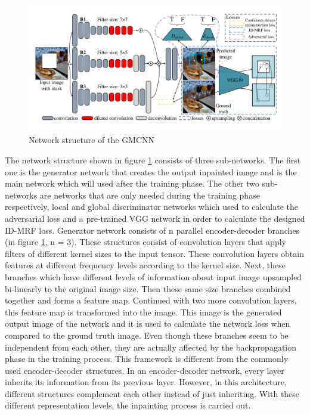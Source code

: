 \begin{figure}[h!]
    \centering
    \includegraphics[width=14cm]{figures/chapter4/gmcnn.png}
    \caption{Network structure of the GMCNN \cite{inpainting_via_multi_cnn}}
    \label{fig:gmcnn}
\end{figure}

The network structure shown in figure \ref{fig:gmcnn} consists of three sub-networks. The first one is the generator network that creates the output inpainted image and is the main network which will used after the training phase. The other two sub-networks are networks that are only needed during the training phase respectively, local and global discriminator networks which used to calculate the adversarial loss and a pre-trained VGG network \cite{very_deep_conv} in order to calculate the designed ID-MRF loss. Generator network consists of n parallel encoder-decoder branches (in figure \ref{fig:gmcnn}, n = 3). These structures consist of convolution layers that apply filters of different kernel sizes to the input tensor. These convolution layers obtain features at different frequency levels according to the kernel size. Next, these branches which have different levels of information about input image upsampled bi-linearly to the original image size. Then these same size branches combined together and forms a feature map. Continued with two more convolution layers, this feature map is transformed into the image. This image is the generated output image of the network and it is used to calculate the network loss when compared to the ground truth image. Even though these branches seem to be independent from each other, they are actually affected by the backpropagation phase in the training process. This framework is different from the commonly used encoder-decoder structures. In an encoder-decoder network, every layer inherits its information from its previous layer. However, in this architecture, different structures complement each other instead of just inheriting. With these different representation levels, the inpainting process is carried out.

